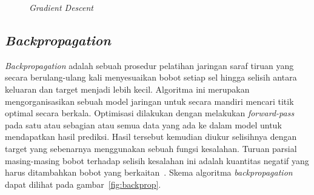 \begin{figure}[htbp]
    \begin{center}
    \end{center}
    \vspace{-20pt}
    \captionsetup{labelfont=bf, textfont=bf}
    \caption{\textit{Gradient Descent}}
    \vspace{-10pt}
    \captionsetup{labelfont=md, textfont=md}
    \label{fig:gradientdescent}
\end{figure}

\subsection{\textit{Backpropagation}}

\textit{Backpropagation} adalah sebuah prosedur pelatihan jaringan saraf tiruan yang secara
berulang-ulang kali menyesuaikan bobot setiap sel hingga selisih antara keluaran dan target menjadi
lebih kecil. Algoritma ini merupakan mengorganisasikan sebuah model jaringan untuk secara mandiri
mencari titik optimal secara berkala. Optimisasi dilakukan dengan melakukan \textit{forward-pass}
pada satu atau sebagian atau semua data yang ada ke dalam model untuk mendapatkan hasil prediksi.
Hasil tersebut kemudian diukur selisihnya dengan target yang sebenarnya menggunakan sebuah fungsi
kesalahan. Turuan parsial masing-masing bobot terhadap selisih kesalahan ini adalah kuantitas negatif
yang harus ditambahkan bobot yang berkaitan~\cite{Rumelhart:1986we}. Skema algoritma \textit{backpropagation}
dapat dilihat pada gambar~\ref{fig:backprop}.

